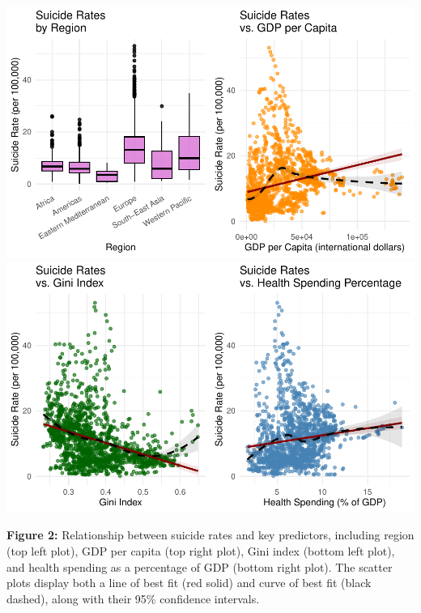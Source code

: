 \documentclass[
]{article}
\begin{document}
\includegraphics{final_report_files/figure-latex/suicide-against-vars-1.pdf}
\includegraphics{final_report_files/figure-latex/suicide-against-vars-2.pdf}

\textbf{Figure 2:} Relationship between suicide rates and key
predictors, including region (top left plot), GDP per capita (top right
plot), Gini index (bottom left plot), and health spending as a
percentage of GDP (bottom right plot). The scatter plots display both a
line of best fit (red solid) and curve of best fit (black dashed), along
with their 95\% confidence intervals.

\newpage
\end{document}
